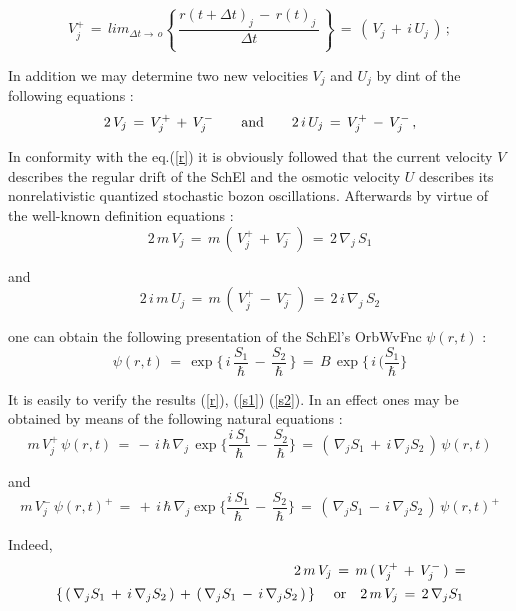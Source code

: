 \documentclass[12pt]{article}
\begin{document}
\begin{equation}\label{q2}
V_j^{+}\,=\,lim_{\Delta t\to\,o}\left\{\,\frac{r(t+\Delta t)_j\,-\,r(t)_j\,}
{\Delta t}\,\right\}\,=\,(\,V_j\,+\,i\,U_j\,)\,;
\end{equation}

  In addition we may determine two new velocities $V_j$ and $U_j$ by dint of
the following equations :
\begin{equation}\label{r}
 2\,V_j\,=\,V_j^+\,+\,V_j^- \qquad {\rm and} \qquad
 2\,i\,U_j\,=\,V_j^+\,-\,V_j^-\,,
\end{equation}

 In conformity with the eq.(\ref{r}) it is obviously followed that the
current velocity $V$ describes the regular drift of the SchEl and the
osmotic velocity $U$ describes its nonrelativistic quantized stochastic
bozon oscillations. Afterwards by virtue of the well-known definition
equations :
\begin{equation}\label{s1}
2\,m\,V_j\,=\,m\,(\,V_j^+\,+\,V_j^-\,)\,=\,2\,\nabla_j\,S_1
\end{equation}

and
\begin{equation}\label{s2}
2\,i\,m\,U_j\,=\,m\,(\,V_j^+\,-\,V_j^-\,)\,=\,2\,i\,\nabla_j\,S_2
\end{equation}

one can obtain the following presentation of the SchEl's OrbWvFnc
$\psi(r,t)$ :
\begin{equation}\label{t}
\psi(r,t)\,=\,\exp\{\,i\,\frac{S_1}{\hbar}\,-\,\frac{S_2}{\hbar}\,\}\,=
\,B\,\exp\{\,i\,(\frac{S_1}{\hbar}\}
\end{equation}

 It is easily to verify the results (\ref{r}), (\ref{s1}) (\ref{s2}). In an
effect ones may be obtained by means of the following natural equations :
\begin{equation}\label{ur1}
m\,V_j^+\,\psi(r,t)\,=
\,-\,i\,\hbar\,\nabla_j\,\exp\{\frac{i\,S_1}{\hbar}\,-\,\frac{S_2}{\hbar}\}\,
=\,(\,\nabla _j S_1\,+\,i\,\nabla _j S_2\,)\,\psi(r,t)
\end{equation}

and
\begin{equation}\label{ur2}
m\,V_j^-\,\psi(r,t)^+\,=
\,+\,i\,\hbar\,\nabla _j \exp\{\frac{i\,S_1}{\hbar}\,-\,\frac{S_2}{\hbar}\}\,
=\,(\,\nabla _j S_1\,-\,i\,\nabla _j S_2\,)\,\psi(r,t)^+
\end{equation}

 Indeed,
\begin{eqnarray}\label{us1}
2\,m\,V_j\,=\,m\,(\,V_j^+\,+\,V_j^-\,)\,=  \nonumber  \\
\,\left\{\,(\,\nabla _j S_1\,+\,i\,\nabla _j S_2\,)\,+
\,(\,\nabla _j S_1\,-\,i\,\nabla _j S_2\,)\,\right\}\,
\quad {\rm or} \quad 2\,m\,V_j\,=\,2\,\nabla _j S_1\,
\end{eqnarray}
\end{document}
